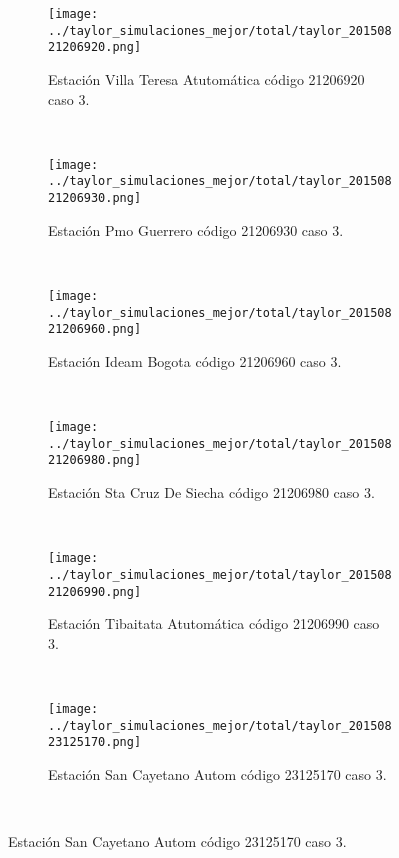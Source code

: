 \begin{figure}[H]\ContinuedFloat
\centering
\begin{subfigure}[normla]{0.4\textwidth}
\texttt{[image: ../taylor\_simulaciones\_mejor/total/taylor\_20150821206920.png]}
\caption{Estación Villa Teresa Atutomática código 21206920 caso 3.}
\end{subfigure}
~
\begin{subfigure}[normla]{0.4\textwidth}
\texttt{[image: ../taylor\_simulaciones\_mejor/total/taylor\_20150821206930.png]}
\caption{Estación Pmo Guerrero código 21206930 caso 3.}
\end{subfigure}
~
\begin{subfigure}[normla]{0.4\textwidth}
\texttt{[image: ../taylor\_simulaciones\_mejor/total/taylor\_20150821206960.png]}
\caption{Estación Ideam Bogota código 21206960 caso 3.}
\end{subfigure}
~
\begin{subfigure}[normla]{0.4\textwidth}
\texttt{[image: ../taylor\_simulaciones\_mejor/total/taylor\_20150821206980.png]}
\caption{Estación Sta Cruz De Siecha código 21206980 caso 3.}
\end{subfigure}
~
\begin{subfigure}[normla]{0.4\textwidth}
\texttt{[image: ../taylor\_simulaciones\_mejor/total/taylor\_20150821206990.png]}
\caption{Estación Tibaitata Atutomática código 21206990 caso 3.}
\end{subfigure}
~
\begin{subfigure}[normla]{0.4\textwidth}
\texttt{[image: ../taylor\_simulaciones\_mejor/total/taylor\_20150823125170.png]}
\caption{Estación San Cayetano Autom código 23125170 caso 3.}
\end{subfigure}
~
\end{figure}
 
